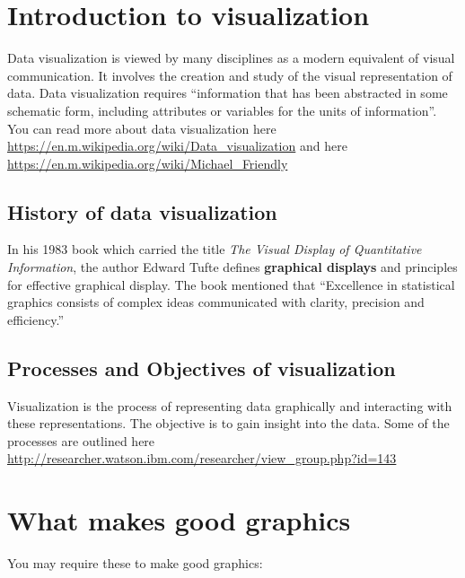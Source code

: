 \documentclass[
]{book}
\begin{document}
\hypertarget{introduction-to-visualization}{%
\section{Introduction to visualization}\label{introduction-to-visualization}}

Data visualization is viewed by many disciplines as a modern equivalent of visual communication. It involves the creation and study of the visual representation of data. Data visualization requires ``information that has been abstracted in some schematic form, including attributes or variables for the units of information''. You can read more about data visualization here \url{https://en.m.wikipedia.org/wiki/Data_visualization} and here \url{https://en.m.wikipedia.org/wiki/Michael_Friendly}

\hypertarget{history-of-data-visualization}{%
\subsection{History of data visualization}\label{history-of-data-visualization}}

In his 1983 book which carried the title \emph{The Visual Display of Quantitative Information}, the author Edward Tufte defines \textbf{graphical displays} and principles for effective graphical display. The book mentioned that ``Excellence in statistical graphics consists of complex ideas communicated with clarity, precision and efficiency.''

\hypertarget{processes-and-objectives-of-visualization}{%
\subsection{Processes and Objectives of visualization}\label{processes-and-objectives-of-visualization}}

Visualization is the process of representing data graphically and interacting with these representations. The objective is to gain insight into the data. Some of the processes are outlined here \url{http://researcher.watson.ibm.com/researcher/view_group.php?id=143}

\hypertarget{what-makes-good-graphics}{%
\section{What makes good graphics}\label{what-makes-good-graphics}}

You may require these to make good graphics:
\end{document}

